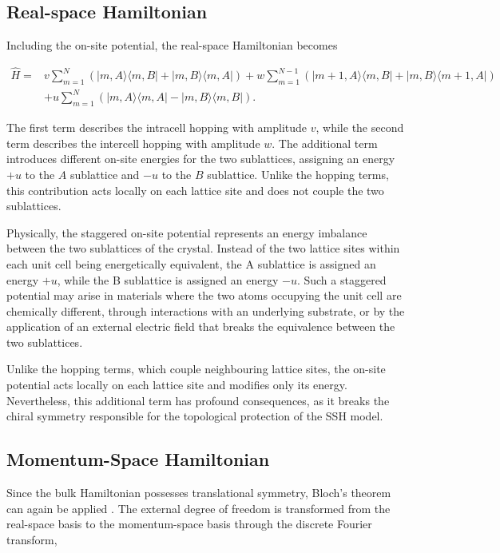 \documentclass[11pt, a4paper]{article}
\begin{document}
\subsection{Real-space Hamiltonian}

Including  the on-site potential, the real-space Hamiltonian becomes

\begin{align}
\hat H
={}&
v\sum_{m=1}^{N}
\left(
|m,A\rangle\langle m,B|
+
|m,B\rangle\langle m,A|
\right)
+
w\sum_{m=1}^{N-1}
\left(
|m+1,A\rangle\langle m,B|
+
|m,B\rangle\langle m+1,A|
\right)
\nonumber\\[0.5em]
&+
u\sum_{m=1}^{N}
\left(
|m,A\rangle\langle m,A|
-
|m,B\rangle\langle m,B|
\right).
\end{align}

The first term describes the intracell hopping with amplitude $v$, while the second term describes the intercell hopping with amplitude $w$. The additional term introduces different on-site energies for the two sublattices, assigning an energy $+u$ to the $A$ sublattice and $-u$ to the $B$ sublattice. Unlike the hopping terms, this contribution acts locally on each lattice site and does not couple the two sublattices.

Physically, the staggered on-site potential represents an energy
imbalance between the two sublattices of the crystal. Instead of the
two lattice sites within each unit cell being energetically equivalent,
the A sublattice is assigned an energy $+u$, while the B sublattice is
assigned an energy $-u$. Such a staggered potential may arise in
materials where the two atoms occupying the unit cell are chemically
different, through interactions with an underlying substrate, or by the
application of an external electric field that breaks the equivalence
between the two sublattices.

Unlike the hopping terms, which couple neighbouring lattice sites, the
on-site potential acts locally on each lattice site and modifies only
its energy. Nevertheless, this additional term has profound
consequences, as it breaks the chiral symmetry responsible for the
topological protection of the SSH model.



\subsection{Momentum-Space Hamiltonian}

Since the bulk Hamiltonian possesses translational symmetry, Bloch's theorem
can again be applied \cite{asboth2015,ashcroft1976}. The external degree of
freedom is transformed from the real-space basis to the momentum-space basis
through the discrete Fourier transform,
\end{document}
